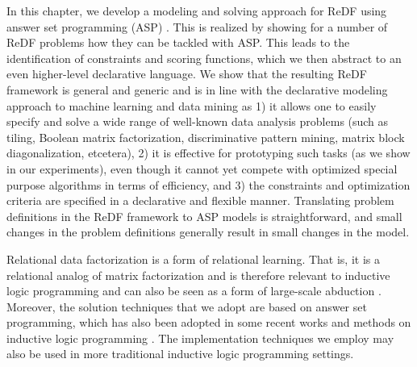 In this chapter, we develop a modeling and solving approach for ReDF using answer set programming (ASP) \parencite{BrewkaCACM}. This is realized by showing for a number of ReDF problems how they can be tackled with ASP.  
This leads to the identification of constraints and scoring functions, which we then abstract to an even higher-level declarative language. 
We show that the resulting ReDF framework is general and generic and is in line with 
  the declarative modeling approach to machine learning and data mining as 
  1) it allows one to easily specify and solve a wide range of well-known data analysis problems (such as tiling, Boolean matrix factorization, discriminative pattern mining, matrix block diagonalization, etcetera),
  2) it is effective for prototyping such tasks (as we show in our experiments), even though it cannot yet compete with optimized special purpose algorithms in terms of efficiency, and 
  3) the constraints and optimization criteria are specified in a declarative and flexible manner. 
  Translating problem definitions in the ReDF framework to ASP models is straightforward, and small changes in the problem definitions generally result in small changes in the model. 
%

  Relational data factorization is a form of relational learning. That is, it is a relational analog of matrix factorization and is therefore relevant to inductive logic programming \parencite{ilp_theory_methods,luc_book} and can also be seen as a form of large-scale abduction \parencite{abduction}. Moreover, the solution techniques that we adopt are based on answer set programming, which has also been adopted in some recent works and methods on inductive logic programming \parencite{ilp_graph_mining,DBLP:conf/lpnmr/Jarvisalo11}. The implementation techniques we employ may also be used in more traditional inductive logic programming settings.

